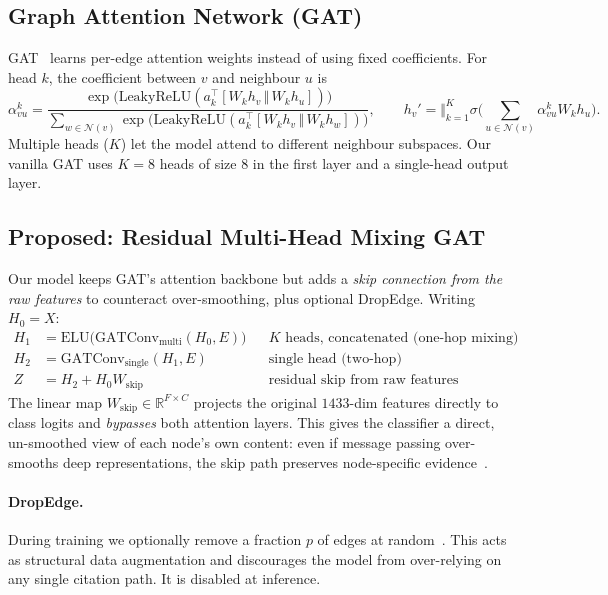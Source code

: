 \documentclass{article}
\begin{document}
\subsection{Graph Attention Network (GAT)}
GAT~\cite{velickovic2018gat} learns per-edge attention weights instead of using fixed
coefficients. For head $k$, the coefficient between $v$ and neighbour $u$ is
\begin{equation}
  \alpha_{vu}^{k} = \frac{\exp\!\big(\mathrm{LeakyReLU}(a_k^\top [W_k h_v \,\Vert\, W_k h_u])\big)}
  {\sum_{w \in \mathcal{N}(v)} \exp\!\big(\mathrm{LeakyReLU}(a_k^\top [W_k h_v \,\Vert\, W_k h_w])\big)},
  \qquad
  h_v' = \Big\Vert_{k=1}^{K} \sigma\!\Big(\sum_{u \in \mathcal{N}(v)} \alpha_{vu}^{k} W_k h_u\Big).
\end{equation}
Multiple heads ($K$) let the model attend to different neighbour subspaces. Our
vanilla GAT uses $K=8$ heads of size 8 in the first layer and a single-head output
layer.

\subsection{Proposed: Residual Multi-Head Mixing GAT}
\label{sec:proposed}

Our model keeps GAT's attention backbone but adds a \emph{skip connection from the
raw features} to counteract over-smoothing, plus optional DropEdge. Writing
$H_0 = X$:
\begin{align}
  H_1 &= \mathrm{ELU}\!\big(\mathrm{GATConv}_{\text{multi}}(H_0, E)\big)
        && \text{$K$ heads, concatenated (one-hop mixing)} \\
  H_2 &= \mathrm{GATConv}_{\text{single}}(H_1, E)
        && \text{single head (two-hop)} \\
  Z   &= H_2 + H_0 W_{\text{skip}}
        && \text{residual skip from raw features}
\end{align}
The linear map $W_{\text{skip}} \in \mathbb{R}^{F \times C}$ projects the original
$1433$-dim features directly to class logits and \emph{bypasses} both attention
layers. This gives the classifier a direct, un-smoothed view of each node's own
content: even if message passing over-smooths deep representations, the skip path
preserves node-specific evidence~\cite{he2016resnet,xu2018jknet}.

\paragraph{DropEdge.} During training we optionally remove a fraction $p$ of edges at
random~\cite{rong2020dropedge}. This acts as structural data augmentation and
discourages the model from over-relying on any single citation path. It is disabled
at inference.
\end{document}
